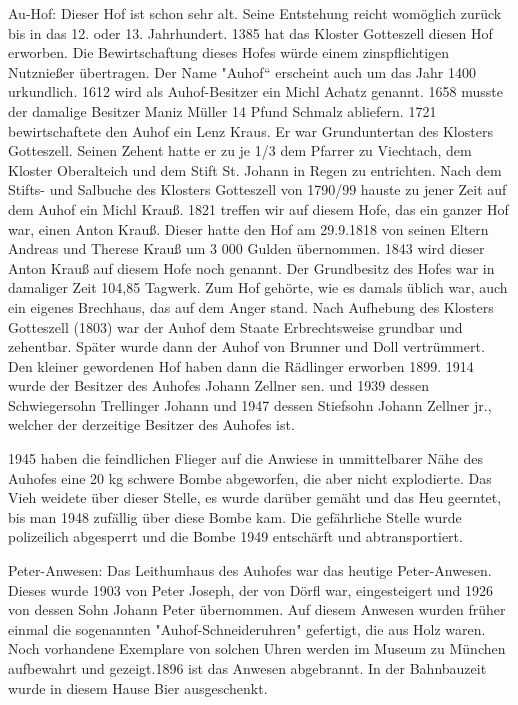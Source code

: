 Au-Hof: Dieser Hof ist schon sehr alt. Seine Entstehung reicht womöglich zurück
bis in das 12. oder 13. Jahrhundert. 1385 hat das Kloster Gotteszell diesen Hof
erworben. Die Bewirtschaftung dieses Hofes würde einem zinspflichtigen
Nutznießer übertragen. Der Name "Auhof“ erscheint auch um das Jahr 1400
urkundlich. 1612 wird als Auhof-Besitzer ein Michl Achatz genannt. 1658 musste
der damalige Besitzer Maniz Müller 14 Pfund Schmalz abliefern. 1721
bewirtschaftete den Auhof ein Lenz Kraus. Er war Grunduntertan des Klosters
Gotteszell. Seinen Zehent hatte er zu je 1/3 dem Pfarrer zu Viechtach, dem
Kloster Oberalteich und dem Stift St. Johann in Regen zu entrichten. Nach dem
Stifts- und Salbuche des Klosters Gotteszell von 1790/99 hauste zu jener Zeit
auf dem Auhof ein Michl Krauß. 1821 treffen wir auf diesem Hofe, das ein ganzer
Hof war, einen Anton Krauß. Dieser hatte den Hof am 29.9.1818 von seinen Eltern
Andreas und Therese Krauß um 3 000 Gulden übernommen. 1843 wird dieser Anton
Krauß auf diesem Hofe noch genannt. Der Grundbesitz des Hofes war in damaliger
Zeit 104,85 Tagwerk. Zum Hof gehörte, wie es damals üblich war, auch ein eigenes
Brechhaus, das auf dem Anger stand. Nach Aufhebung des Klosters Gotteszell
(1803) war der Auhof dem Staate Erbrechtsweise grundbar und zehentbar. Später
wurde dann der Auhof von Brunner und Doll vertrümmert. Den kleiner gewordenen
Hof haben dann die Rädlinger erworben 1899. 1914 wurde der Besitzer des Auhofes
Johann Zellner sen. und 1939 dessen Schwiegersohn Trellinger Johann und 1947
dessen Stiefsohn Johann Zellner jr., welcher der derzeitige Besitzer des Auhofes
ist.

1945 haben die feindlichen Flieger auf die Anwiese in unmittelbarer Nähe des
Auhofes eine 20 kg schwere Bombe abgeworfen, die aber nicht explodierte. Das
Vieh weidete über dieser Stelle, es wurde darüber gemäht und das Heu geerntet,
bis man 1948 zufällig über diese Bombe kam. Die gefährliche Stelle wurde
polizeilich abgesperrt und die Bombe 1949 entschärft und abtransportiert.

Peter-Anwesen: Das Leithumhaus des Auhofes war das heutige Peter-Anwesen. Dieses
wurde 1903 von Peter Joseph, der von Dörfl war, eingesteigert und 1926 von
dessen Sohn Johann Peter übernommen. Auf diesem Anwesen wurden früher einmal die
sogenannten "Auhof-Schneideruhren" gefertigt, die aus Holz waren. Noch
vorhandene Exemplare von solchen Uhren werden im Museum zu München aufbewahrt
und gezeigt.1896 ist das Anwesen abgebrannt. In der Bahnbauzeit wurde in diesem
Hause Bier ausgeschenkt.

